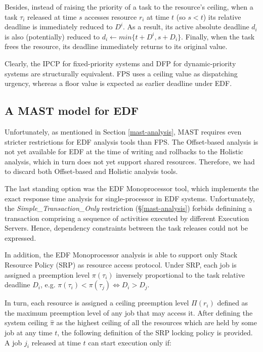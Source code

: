\documentclass{article}
\begin{document}
Besides, instead of raising the priority of a task to the resource's ceiling, when a task $\tau_i$ released at time $s$ accesses resource $r_i$ at time $t$ (so $s < t$) its relative deadline is immediately reduced to $D^i$. As a result, its active absolute deadline $d_i$ is also (potentially) reduced to $d_i \leftarrow min\{t + D^i, s + D_i\}$. Finally, when the task frees the resource, its deadline immediately returns to its original value.

Clearly, the IPCP for fixed-priority systems and DFP for dynamic-priority systems are structurally equivalent. FPS uses a ceiling value as dispatching urgency, whereas a floor value is expected as earlier deadline under EDF.

\subsection{A MAST model for EDF}

Unfortunately, as mentioned in Section \ref{mast-analysis}, MAST requires even stricter restrictions for EDF analysis tools than FPS. The Offset-based analysis is not yet available for EDF at the time of writing and rollbacks to the Holistic analysis, which in turn does not yet support shared resources. Therefore, we had to discard both Offset-based and Holistic analysis tools.

The last standing option was the EDF Monoprocessor tool, which implements the exact response time analysis for single-processor in EDF systems. Unfortunately, the \textit{Simple\_Transaction\_Only} restriction (§\ref{mast-analysis}) forbids definining a transaction comprising a sequence of activities executed by different Execution Servers. Hence, dependency constraints between the task releases could not be expressed.

In addition, the EDF Monoprocessor analysis is able to support only Stack Resource Policy (SRP) \cite{resource-sharing} as resource access protocol. Under SRP, each job is assigned a preemption level $\pi(\tau_i)$ inversely proportional to the task relative deadline $D_i$, e.g. $\pi(\tau_i) < \pi(\tau_j) \Leftrightarrow D_i > D_j$.

In turn, each resource is assigned a ceiling preemption level $\Pi(r_i)$ defined as the maximum preemption level of any job that may access it. After defining the system ceiling $\hat{\pi}$ as the highest ceiling of all the resources which are held by some job at any time $t$, the following definition of the SRP locking policy is provided. A job $j_i$ released at time $t$ can start execution only if:
\end{document}
